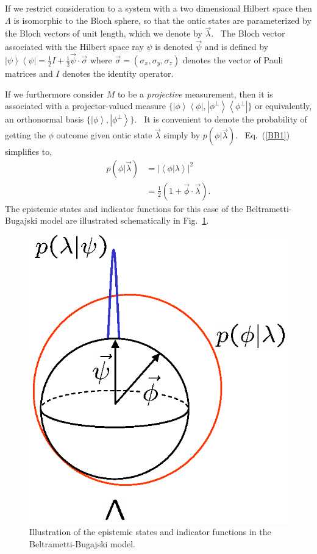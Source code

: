 \documentclass[aps,nofootinbib,12pt]{revtex4}
\begin{document}
If we restrict consideration to a system with a two dimensional
Hilbert space then $\Lambda$ is isomorphic to the Bloch sphere, so
that the ontic states are parameterized by the Bloch vectors of unit
length, which we denote by $\vec{\lambda}.$ \ The Bloch vector
associated with the Hilbert space ray $\psi$ is denoted $\vec{\psi}$
and is defined by $\left\vert \psi\right\rangle \left\langle
\psi\right\vert
=\frac{1}{2}I+\frac{1}{2}\vec{\psi}\cdot\vec{\sigma}$ where
$\vec{\sigma }=(\sigma_{x},\sigma_{y},\sigma_{z})$ denotes the
vector of Pauli matrices and $I$ denotes the identity operator.

If we furthermore consider $M$ to be a \textit{projective}
measurement, then it is associated with a projector-valued measure
$\{\left\vert \phi \right\rangle \left\langle \phi\right\vert
,\left\vert \phi^{\perp }\right\rangle \left\langle
\phi^{\perp}\right\vert \}$ or equivalently, an orthonormal basis
$\{\left\vert \phi\right\rangle ,\left\vert \phi^{\perp
}\right\rangle \}.$ \ It is convenient to denote the probability of
getting the $\phi$ outcome given ontic state $\vec{\lambda}$ simply
by $p(\phi |\vec{\lambda})$. \ Eq.~(\ref{BB1}) simplifies to,
\begin{align}
p(  \phi|\vec{\lambda})    & =|\left\langle \phi|\lambda
\right\rangle |^{2}\\
& =\frac{1}{2}\left(  1+\vec{\phi}\cdot\vec{\lambda}\right)
\label{BBif}.
\end{align}
The epistemic states and indicator functions for this case of the
Beltrametti-Bugajski model are illustrated schematically in
Fig.~\ref{FIG:bbmodel}.

\begin{figure}[t]
\includegraphics[scale=0.6]{bbmodel}\caption{Illustration of the epistemic
states and indicator functions in the Beltrametti-Bugajski model.}
\label{FIG:bbmodel}
\end{figure}
\end{document}
